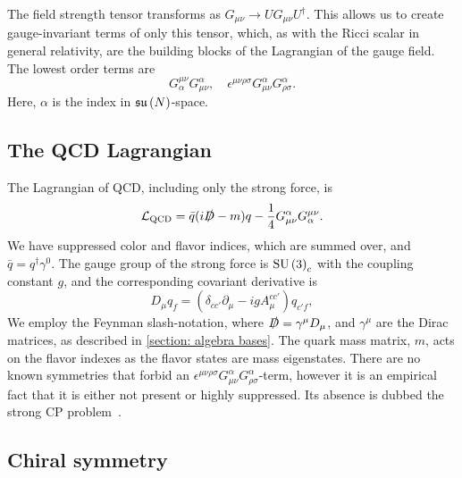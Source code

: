 The field strength tensor transforms as $G_{\mu\nu} \rightarrow U G_{\mu \nu}U^\dagger$.
This allows us to create gauge-invariant terms of only this tensor, which, as with the Ricci scalar in general relativity, are the building blocks of the Lagrangian of the gauge field.
The lowest order terms are
%
\begin{equation}
    G^{\mu \nu}_\alpha G_{\mu \nu}^\alpha, \quad
    \epsilon^{\mu \nu \rho \sigma} G_{\mu \nu}^\alpha G_{\rho \sigma}^\alpha.
\end{equation}
%
Here, $\alpha$ is the index in $\mathfrak{su}\left(N\right)$-space.



\subsection{The QCD Lagrangian}

The Lagrangian of QCD, including only the strong force, is
%
\begin{equation}
    \mathcal{L}_{\text{QCD}} 
    = \bar q (i \slashed D - m)q - \frac{1}{4} G_{\mu \nu}^\alpha G^{\mu \nu}_\alpha.
\end{equation}
%
We have suppressed color and flavor indices, which are summed over, and $\bar q = q^\dagger \gamma^0$.
The gauge group of the strong force is $\text{SU}\left(3\right)_c$ with the coupling constant $g$, and the corresponding covariant derivative is
%
\begin{equation}
    D_\mu q_f =  (\delta_{cc'} \partial_\mu - i g A_\mu^{cc'}) q_{c'f},
\end{equation}
%
We employ the Feynman slash-notation, where $\slashed D = \gamma^\mu D_\mu$, and $\gamma^\mu$ are the Dirac matrices, as described in \autoref{section: algebra bases}.
The quark mass matrix, $m$, acts on the flavor indexes as the flavor states are mass eigenstates.
There are no known symmetries that forbid an $\epsilon^{\mu \nu \rho \sigma} G_{\mu \nu}^\alpha G_{\rho \sigma}^\alpha$-term, however it is an empirical fact that it is either not present or highly suppressed. 
Its absence is dubbed the strong CP problem~\autocite{schwartzQuantumFieldTheory2013}.



\subsection{Chiral symmetry}
\label{subsection: chiral symmetry}

